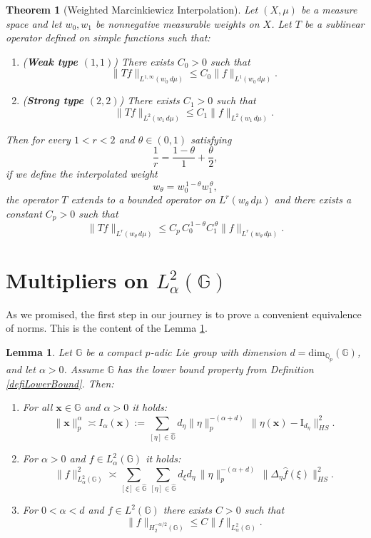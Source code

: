 \documentclass[12pt, reqno]{amsart}
\newtheorem{lema}[defi]{Lemma}
\newtheorem{teo}[defi]{Theorem}
\newcommand{\Q}{\mathbb{Q}}
\newcommand{\1}{\mathds{1}}
\newcommand{\G}{\mathbb{G}}
\begin{document}
\begin{teo}[Weighted Marcinkiewicz Interpolation]\label{teoMarcinkiewicz}
Let $(X,\mu)$ be a measure space and let $w_0, w_1$ be nonnegative measurable weights on $X$. 
Let $T$ be a sublinear operator defined on simple functions such that:

\begin{enumerate}
    \item[\textnormal{(i)}] (\textbf{Weak type $(1,1)$}) There exists $C_0>0$ such that
    \[
    \|Tf\|_{L^{1,\infty}(w_0\, d\mu)}
    \le C_0 \|f\|_{L^{1}(w_0\, d\mu)}.
    \]
    
    \item[\textnormal{(ii)}] (\textbf{Strong type $(2,2)$}) There exists $C_1>0$ such that
    \[
    \|Tf\|_{L^{2}(w_1\, d\mu)}
    \le C_1 \|f\|_{L^{2}(w_1\, d\mu)}.
    \]
\end{enumerate}

Then for every $1<r<2$ and $\theta \in (0,1)$ satisfying
\[
\frac{1}{r} = \frac{1-\theta}{1} + \frac{\theta}{2},
\]
if we define the interpolated weight
\[
w_\theta = w_0^{\,1-\theta} w_1^{\,\theta},
\]
the operator $T$ extends to a bounded operator on $L^r(w_\theta\, d\mu)$ and there exists a constant $C_p>0$ such that
\[
\|Tf\|_{L^{r}(w_\theta\, d\mu)}
\le C_p \, C_0^{\,1-\theta} C_1^{\,\theta}
\|f\|_{L^{r}(w_\theta\, d\mu)}.
\]
\end{teo}




\section{Multipliers on $L^2_\alpha(\mathbb{G})$}
As we promised, the first step in our journey is to prove a convenient equivalence of norms. This is the content of the Lemma \ref{lemma3.1}.

\begin{lema}\label{lemma3.1}
Let $\G$ be a compact $p$-adic Lie group with dimension $d= \mathrm{dim}_{\Q_p} (\G)$, and let $\alpha > 0$. Assume $\G$ has the lower bound property from Definition \ref{defiLowerBound}. Then:
\begin{enumerate}
    \item[(i)] For all $\mathbf{x} \in \mathbb{G}$ and $\alpha > 0$ it holds:
    \[
    \|\mathbf{x}\|_{p}^\alpha \asymp I_\alpha(\mathbf{x}) := 
    \sum_{[\eta] \in \widehat{\G}} 
    d_\eta \|\eta\|_p^{-(\alpha+d)}  \, \|\eta(\mathbf{x}) - \mathrm{I}_{d_\eta} \|^2_{HS} .
    \]

    \item[(ii)] For $\alpha > 0$ and $f \in L^2_\alpha(\mathbb{G})$ it holds:
    \[
    \| f \|^2_{L^2_\alpha(\mathbb{G})} \asymp 
    \sum_{[\xi] \in \widehat{\mathbb{G}}} 
    \sum_{[\eta] \in \widehat{\mathbb{G}}}
    d_\xi d_\eta \, 
    \|\eta\|_p^{-(\alpha+d)} \, 
    \|\Delta_{\eta} \hat{f}(\xi)\|^2_{HS}.
    \]

    \item[(iii)] For $0 < \alpha < d$ and $f \in L^2(\mathbb{G})$ there exists $C>0$ such that
    \[
    \|f\|_{H^{- \alpha/2}_2(\mathbb{G})} \leq C \|f\|_{L^2_\alpha(\mathbb{G})}.
    \]
\end{enumerate}
\end{lema}
\end{document}
